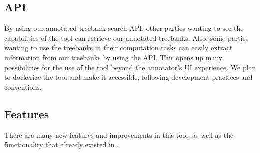 \subsection{API}
\label{sec:api}

By using our annotated treebank search API, other parties wanting to see the capabilities of the tool can retrieve our annotated treebanks.
Also, some parties wanting to use the treebanks in their computation tasks can easily extract information from our treebanks by using the API.
This opens up many possibilities for the use of the tool beyond the annotator's UI experience.
We plan to dockerize the tool and make it accessible, following development practices and conventions.

\subsection{Features}
\label{sec:features}

There are many new features and improvements in this tool, as well as the functionality that already existed in \boatvone.

